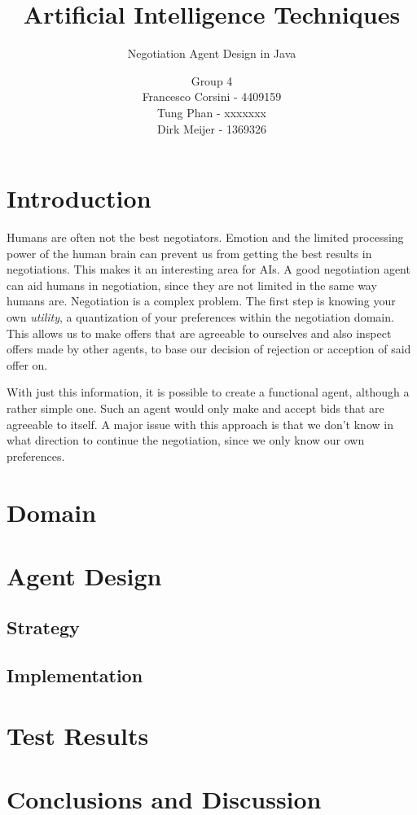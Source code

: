 \documentclass[a4,10pt]{scrartcl}
\title{Artificial Intelligence Techniques}
\subtitle{Negotiation Agent Design in Java}
\author{Group 4\\Francesco Corsini - 4409159\\Tung Phan - xxxxxxx\\Dirk Meijer - 1369326}
\begin{document}
\maketitle

\null\vfill
\tableofcontents
\pagebreak

\section{Introduction}

Humans are often not the best negotiators. Emotion and the limited 
processing power of the human brain can prevent us from getting the 
best results in negotiations. This makes it an interesting area for 
AIs. A good negotiation agent can aid humans in negotiation, since they 
are not limited in the same way humans are.
Negotiation is a complex problem. The first step is knowing your own 
\emph{utility}, a quantization of your preferences within the 
negotiation domain. This allows us to make offers that are agreeable to
ourselves and also inspect offers made by other agents, to base our
decision of rejection or acception of said offer on.

With just this information, it is possible to create a functional agent,
although a rather simple one. Such an agent would only make and accept
bids that are agreeable to itself. A major issue with this approach is
that we don't know in what direction to continue the negotiation, since
we only know our own preferences.

\section{Domain}

\section{Agent Design}
\subsection{Strategy}
\subsection{Implementation}

\section{Test Results}

\section{Conclusions and Discussion}
\end{document}
